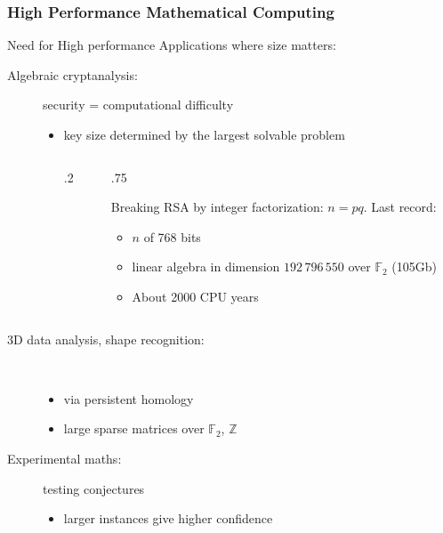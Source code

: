 \documentclass{beamer}
\newcommand{\Z}{\ensuremath{\mathbb{Z}\xspace}}
\newcommand{\F}{\ensuremath{\mathbb{F}\xspace}}
\begin{document}
\begin{frame}
  \frametitle{High Performance Mathematical Computing}
    {Need for High performance}
    Applications where size matters:
    \begin{description}
    \item[Algebraic cryptanalysis:] security = computational difficulty
      \begin{itemize}
      \item key size determined by the largest solvable problem
        \begin{columns}
          \begin{column}
            {.2\textwidth}
          \end{column}
          \begin{column}
            {.75\textwidth}
        \begin{example}
        {\small Breaking RSA by integer factorization: $n=pq$}.   Last record:
        \begin{itemize}
        \item $n$ of 768 bits
        \item linear algebra in dimension $192\,796\,550$ over $\mathbb{F}_2$ (105Gb)
        \item About 2000 CPU years
        \end{itemize}
      \end{example}
          \end{column}
        \end{columns}
      \end{itemize}
    \item[3D data analysis, shape recognition:] \
      \begin{itemize}
      \item via persistent homology
      \item large sparse matrices over $\F_2$, \Z
      \end{itemize}
    \item[Experimental maths:] testing conjectures
      \begin{itemize}
      \item larger instances give higher confidence
      \end{itemize}
    \end{description}
    
    
\end{frame}
\end{document}
